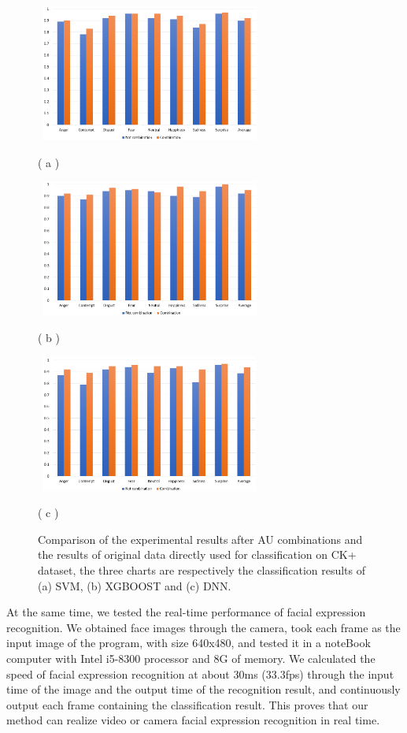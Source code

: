 \documentclass[10pt, conference, compsocconf]{IEEEtran}
\begin{document}
\begin{figure}
	\centering
	\begin{minipage}[c]{0.5\textwidth}
		\centering	
		\includegraphics[height=4.5cm,width=7.5cm]{SVM}
	\end{minipage}
	( a )
	\begin{minipage}[c]{0.5\textwidth}
		\centering
		\includegraphics[height=4.5cm,width=7.5cm]{XGBOOST}	
	\end{minipage}
	( b )
	\begin{minipage}[c]{0.5\textwidth}
		\centering
		\includegraphics[height=4.5cm,width=7.5cm]{DNN}	
	\end{minipage}
	( c )
	\caption{Comparison of the experimental results after AU combinations and the results of original data directly used for classification on CK+ dataset, the three charts are respectively the classification results of (a) SVM, (b) XGBOOST and (c) DNN.}
\end{figure}

At the same time, we tested the real-time performance of facial expression recognition. We obtained face images through the camera, took each frame as the input image of the program, with size 640x480, and tested it in a noteBook computer with Intel i5-8300 processor and 8G of memory. We calculated the speed of facial expression recognition at about 30ms (33.3fps) through the input time of the image and the output time of the recognition result, and continuously output each frame  containing the classification result. This proves that our method can realize video or camera facial expression recognition in real time.
\end{document}
